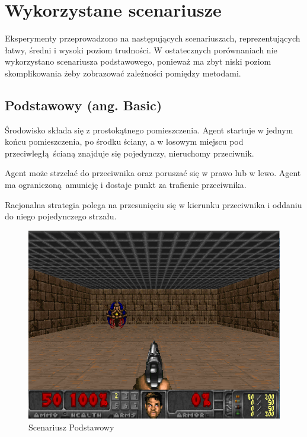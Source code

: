 \documentclass[polish,master,a4paper,oneside]{ppfcmthesis}
\begin{document}
 \section{Wykorzystane scenariusze}
Eksperymenty przeprowadzono na następujących scenariuszach, reprezentujących łatwy, średni i wysoki poziom trudności. W ostatecznych porównaniach nie wykorzystano scenariusza podstawowego, ponieważ ma zbyt niski poziom skomplikowania żeby zobrazować zależności pomiędzy metodami.

\subsection{Podstawowy (ang. Basic)}\label{scenario_basic}
Środowisko składa się z prostokątnego pomieszczenia. Agent startuje w jednym końcu pomieszczenia, po środku ściany, a w losowym miejscu pod przeciwległą ścianą znajduje się pojedynczy, nieruchomy przeciwnik.

Agent może strzelać do przeciwnika oraz poruszać się w prawo lub w lewo. Agent ma ograniczoną amunicję i dostaje punkt za trafienie przeciwnika.

Racjonalna strategia polega na przesunięciu się w kierunku przeciwnika i oddaniu do niego pojedynczego strzału.

\begin{center}
\begin{figure}[H]
\includegraphics[scale = 0.4]{figures/screens/scenarios/basic.png}{\caption{Scenariusz Podstawowy}\label{fig:scenario_basic}}
\end{figure}
\end{center}
\end{document}
